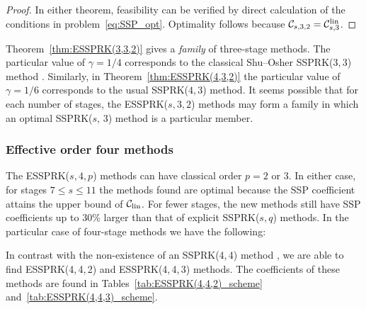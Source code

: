 \begin{proof}
	In either theorem, feasibility can be verified by direct calculation of the 
	conditions in problem~\eqref{eq:SSP_opt}. Optimality follows because 
	$\mathcal{C}_{s,3,2} = \mathcal{C}^{\textnormal{lin}}_{s,3}$.
\end{proof}

Theorem~\ref{thm:ESSPRK(3,3,2)} gives a \emph{family} of three-stage 
methods. 
The particular value of $\gamma = 1/4$ corresponds to the classical
Shu--Osher SSPRK($3,3$) method \cite{Gottlieb/Shu:1998}.
Similarly, in Theorem~\ref{thm:ESSPRK(4,3,2)} the particular value of 
$\gamma = 1/6$ corresponds to the usual SSPRK($4,3$) method.
It seems possible that for each number of stages, the 
ESSPRK($s, 3, 2$) methods may form a family in which an optimal 
SSPRK($s$, $3$) method is a particular member. 

\subsubsection{Effective order four methods}\label{subsubsec:4th_ESSPRK}
The ESSPRK($s,4,p$) methods can have classical order $p=2$ or $3$.
In either case, for stages $7 \le s \le 11$ the methods found are
optimal because the SSP coefficient attains the upper bound of
$\mathcal{C}_{\text{lin}}$.
For fewer stages, the new methods still have SSP coefficients up to
30\% larger than that of explicit SSPRK($s,q$) methods.
In the particular case of four-stage methods we have the following:%
\begin{remark}
	In contrast with the non-existence of an SSPRK(4,\,4) method 
	\cite{Gottlieb/Shu:1998,Ruuth2002}, 
	we are able to find ESSPRK(4,\,4,\,2) and ESSPRK(4,\,4,\,3) methods.
	The coefficients of these methods are found in
	Tables~\ref{tab:ESSPRK(4,4,2)_scheme}
	and~\ref{tab:ESSPRK(4,4,3)_scheme}.
\end{remark}

